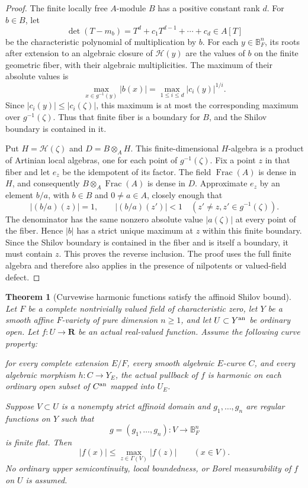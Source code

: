 \documentclass[11pt,a4paper]{article}
\numberwithin{equation}{section}
\newtheorem{theorem}{Theorem}[section]
\theoremstyle{definition}
\theoremstyle{remark}
\begin{document}
\begin{proof}
The finite locally free $A$-module $B$ has a positive constant rank
$d$.  For $b\in B$, let
\[
 \det(T-m_b)=T^d+c_1T^{d-1}+\cdots+c_d\in A[T]
\]
be the characteristic polynomial of multiplication by $b$.  For
each $y\in\mathbb B_F^n$, its roots after extension to an
algebraic closure of $\mathscr H(y)$ are the values of $b$ on the
finite geometric fiber, with their algebraic multiplicities.
The maximum of their absolute values is
\[
 \max_{x\in g^{-1}(y)}|b(x)|
                  =\max_{1\leq i\leq d}|c_i(y)|^{1/i}.
\]
Since $|c_i(y)|\leq|c_i(\zeta)|$, this maximum is at most the
corresponding maximum over $g^{-1}(\zeta)$.  Thus that finite
fiber is a boundary for $B$, and the Shilov boundary is contained
in it.

Put $H=\mathscr H(\zeta)$ and
$D=B\otimes_A H$.  This finite-dimensional $H$-algebra is a
product of Artinian local algebras, one for each point of
$g^{-1}(\zeta)$.  Fix a point $z$ in that fiber and let $e_z$
be the idempotent of its factor.  The field $\operatorname{Frac}(A)$
is dense in $H$, and consequently
$B\otimes_A\operatorname{Frac}(A)$ is dense in $D$.
Approximate $e_z$ by an element $b/a$, with $b\in B$ and
$0\ne a\in A$, closely enough that
\[
 |(b/a)(z)|=1,
 \qquad |(b/a)(z')|<1\quad(z'\ne z, z'\in g^{-1}(\zeta)).
\]
The denominator has the same nonzero absolute value $|a(\zeta)|$
at every point of the fiber.  Hence $|b|$ has a strict unique
maximum at $z$ within this finite boundary.  Since the Shilov
boundary is contained in the fiber and is itself a boundary, it
must contain $z$.  This proves the reverse inclusion.  The proof
uses the full finite algebra and therefore also applies in the
presence of nilpotents or valued-field defect.
\end{proof}

\begin{theorem}[Curvewise harmonic functions satisfy the affinoid Shilov bound]
\label{thm:r5-curvewise-shilov-without-usc}
Let $F$ be a complete nontrivially valued field of characteristic zero, let $Y$ be a
smooth affine $F$-variety of pure dimension $n\geq1$, and let
$U\subset Y^{\rm an}$ be ordinary open.  Let $f:U\to\mathbf R$
be an actual real-valued function.  Assume the following
curve property:

for every complete extension $E/F$, every smooth algebraic
$E$-curve $C$, and every algebraic morphism $h:C\to Y_E$, the
actual pullback of $f$ is harmonic on each ordinary open subset
of $C^{\rm an}$ mapped into $U_E$.

Suppose $V\subset U$ is a nonempty strict affinoid domain and
$g_1,\ldots,g_n$ are regular functions on $Y$ such that
\[
 g=(g_1,\ldots,g_n):V\longrightarrow\mathbb B_F^n
\]
is finite flat.  Then
\begin{equation}
                  |f(x)|\leq\max_{z\in\Gamma(V)}|f(z)|
                  \qquad(x\in V).
 \label{eq:r5-shilov-bound-without-usc}
\end{equation}
No ordinary upper semicontinuity, local boundedness, or Borel
measurability of $f$ on $U$ is assumed.
\end{theorem}
\end{document}
